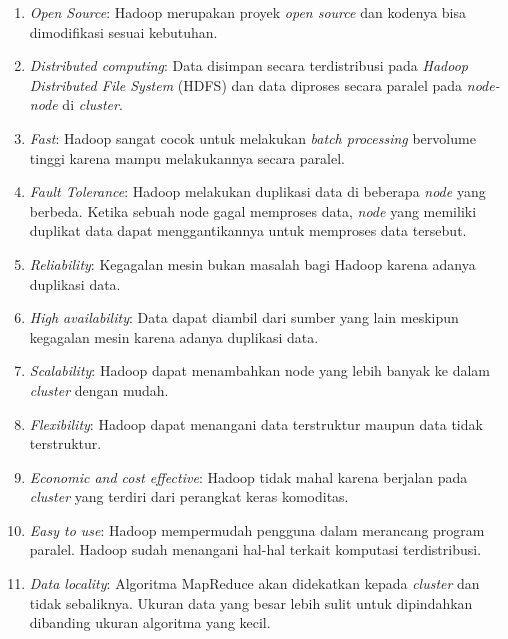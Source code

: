 \begin{enumerate}

\item {\it Open Source}: Hadoop merupakan proyek {\it open source} dan kodenya bisa dimodifikasi sesuai kebutuhan. 

\item {\it Distributed computing}: Data disimpan secara terdistribusi pada \textit{Hadoop Distributed File System} (HDFS) dan data diproses secara paralel pada \textit{node-node} di {\it cluster}.

\item {\it Fast}: Hadoop sangat cocok untuk melakukan {\it batch processing} bervolume tinggi karena mampu melakukannya secara paralel.

\item {\it Fault Tolerance}: Hadoop melakukan duplikasi data di beberapa \textit{node} yang berbeda. Ketika sebuah node gagal memproses data, \textit{node} yang memiliki duplikat data dapat menggantikannya untuk memproses data tersebut.

\item {\it Reliability}: Kegagalan mesin bukan masalah bagi Hadoop karena adanya duplikasi data.


\item {\it High availability}: Data dapat diambil dari sumber yang lain meskipun kegagalan mesin karena adanya duplikasi data.

\item {\it Scalability}: Hadoop dapat menambahkan node yang lebih banyak ke dalam {\it cluster} dengan mudah.

\item {\it Flexibility}: Hadoop dapat menangani data terstruktur maupun data tidak terstruktur. 

\item {\it Economic and cost effective}: Hadoop tidak mahal karena berjalan pada {\it cluster} yang terdiri dari perangkat keras komoditas.

\item {\it Easy to use}: Hadoop mempermudah pengguna dalam merancang program paralel. Hadoop sudah menangani hal-hal terkait komputasi terdistribusi.

\item {\it Data locality}: Algoritma MapReduce akan didekatkan kepada {\it cluster} dan tidak sebaliknya. Ukuran data yang besar lebih sulit untuk dipindahkan dibanding ukuran algoritma yang kecil.


\end{enumerate}

